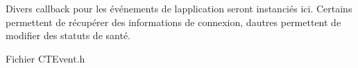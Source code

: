 Divers callback pour les événements de l\textquotesingle{}application seront instanciés ici. Certains permettent de récupérer des informations de connexion, d\textquotesingle{}autres permettent de modifier des statuts de santé.

Fichier CTEvent.\+h 